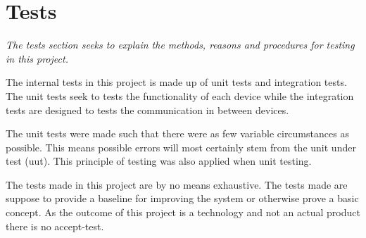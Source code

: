 \section{Tests}
\textit{The tests section seeks to explain the methods, reasons and procedures for testing in this project.}

The internal tests in this project is made up of unit tests and integration tests. The unit tests seek to tests the functionality of each device while the integration tests are designed to tests the communication in between devices.

The unit tests were made such that there were as few variable circumstances as possible. This means possible errors will most certainly stem from the unit under test (uut). This principle of testing was also applied when unit testing.

The tests made in this project are by no means exhaustive. The tests made are suppose to provide a baseline for improving the system or otherwise prove a basic concept. As the outcome of this project is a technology and not an actual product there is no accept-test.

